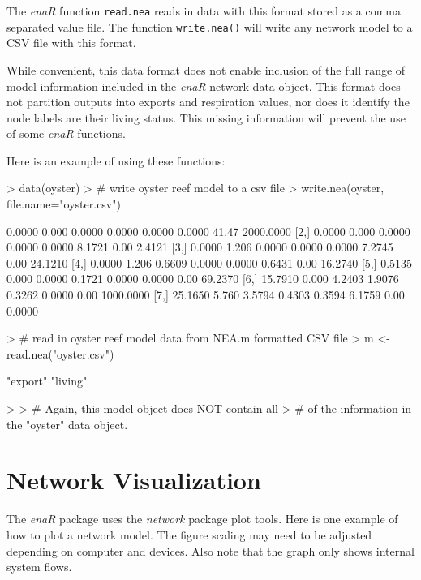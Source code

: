 \documentclass[article]{jss}
\begin{document}
The \textit{enaR} function \texttt{read.nea} reads in data with this
format stored as a comma separated value file.  The function
\texttt{write.nea()} will write any network model to a CSV file with
this format.

While convenient, this data format does not enable inclusion of the
full range of model information included in the \textit{enaR} network
data object.  This format does not partition outputs into exports and
respiration values, nor does it identify the node labels are their
living status. This missing information will prevent the use of some
\textit{enaR} functions.

Here is an example of using these functions:
\begin{Schunk}
\begin{Sinput}
> data(oyster)
> # write oyster reef model to a csv file
> write.nea(oyster, file.name="oyster.csv")
\end{Sinput}
\begin{Soutput}
        [,1]  [,2]   [,3]   [,4]   [,5]   [,6]  [,7]      [,8]
[1,]  0.0000 0.000 0.0000 0.0000 0.0000 0.0000 41.47 2000.0000
[2,]  0.0000 0.000 0.0000 0.0000 0.0000 8.1721  0.00    2.4121
[3,]  0.0000 1.206 0.0000 0.0000 0.0000 7.2745  0.00   24.1210
[4,]  0.0000 1.206 0.6609 0.0000 0.0000 0.6431  0.00   16.2740
[5,]  0.5135 0.000 0.0000 0.1721 0.0000 0.0000  0.00   69.2370
[6,] 15.7910 0.000 4.2403 1.9076 0.3262 0.0000  0.00 1000.0000
[7,] 25.1650 5.760 3.5794 0.4303 0.3594 6.1759  0.00    0.0000
\end{Soutput}
\begin{Sinput}
> # read in oyster reef model data from NEA.m formatted CSV file
> m <- read.nea("oyster.csv")
\end{Sinput}
\begin{Soutput}
[1] "export" "living"
\end{Soutput}
\begin{Sinput}
> 
> # Again, this model object does NOT contain all
> # of the information in the "oyster" data object.
\end{Sinput}
\end{Schunk}

\section{Network Visualization}

The \textit{enaR} package uses the \textit{network} package plot tools. Here is
one example of how to plot a network model. The figure scaling may
need to be adjusted depending on computer and devices. Also note that
the graph only shows internal system flows.
\end{document}

